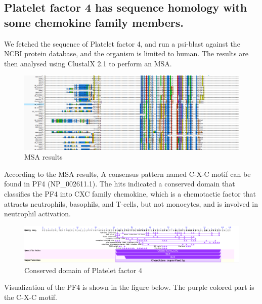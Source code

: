 \subsection{Platelet factor 4 has sequence homology with some chemokine family members.}

We fetched the sequence of Platelet factor 4, and run a psi-blast against the NCBI protein database, and the organism is limited to human. The results are then analysed using ClustalX 2.1 to perform an MSA.

\begin{figure}[H]
    \centering
    \includegraphics[width=1\textwidth]{image/MSA.png}
    \caption{MSA results}
    \label{HMCD3}
\end{figure}

According to the MSA results, A consensus pattern named C-X-C motif can be found in PF4 (NP\_002611.1). The hits indicated a conserved domain that classifies the PF4 into CXC family chemokine, which is a chemotactic factor that attracts neutrophils, basophils, and T-cells, but not monocytes, and is involved in neutrophil activation.

\begin{figure}[H]
    \centering
    \includegraphics[width=1\textwidth]{image/PF4D.png}
    \caption{Conserved domain of Platelet factor 4}
    \label{HMCD3}
\end{figure}

Visualization of the PF4 is shown in the figure below. The purple colored part is the C-X-C motif.

